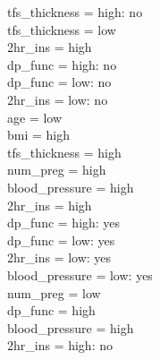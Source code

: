 \documentclass[12pt]{article}
\begin{document}
\textbar\quad \textbar\quad \textbar\quad \textbar\quad \textbar\quad tfs\_thickness = high: no\\
\textbar\quad \textbar\quad \textbar\quad \textbar\quad \textbar\quad tfs\_thickness = low\\
\textbar\quad \textbar\quad \textbar\quad \textbar\quad \textbar\quad \textbar\quad 2hr\_ins = high\\
\textbar\quad \textbar\quad \textbar\quad \textbar\quad \textbar\quad \textbar\quad \textbar\quad dp\_func = high: no\\
\textbar\quad \textbar\quad \textbar\quad \textbar\quad \textbar\quad \textbar\quad \textbar\quad dp\_func = low: no\\
\textbar\quad \textbar\quad \textbar\quad \textbar\quad \textbar\quad \textbar\quad 2hr\_ins = low: no\\
\textbar\quad age = low\\
\textbar\quad \textbar\quad bmi = high\\
\textbar\quad \textbar\quad \textbar\quad tfs\_thickness = high\\
\textbar\quad \textbar\quad \textbar\quad \textbar\quad num\_preg = high\\
\textbar\quad \textbar\quad \textbar\quad \textbar\quad \textbar\quad blood\_pressure = high\\
\textbar\quad \textbar\quad \textbar\quad \textbar\quad \textbar\quad \textbar\quad 2hr\_ins = high\\
\textbar\quad \textbar\quad \textbar\quad \textbar\quad \textbar\quad \textbar\quad \textbar\quad dp\_func = high: yes\\
\textbar\quad \textbar\quad \textbar\quad \textbar\quad \textbar\quad \textbar\quad \textbar\quad dp\_func = low: yes\\
\textbar\quad \textbar\quad \textbar\quad \textbar\quad \textbar\quad \textbar\quad 2hr\_ins = low: yes\\
\textbar\quad \textbar\quad \textbar\quad \textbar\quad \textbar\quad blood\_pressure = low: yes\\
\textbar\quad \textbar\quad \textbar\quad \textbar\quad num\_preg = low\\
\textbar\quad \textbar\quad \textbar\quad \textbar\quad \textbar\quad dp\_func = high\\
\textbar\quad \textbar\quad \textbar\quad \textbar\quad \textbar\quad \textbar\quad blood\_pressure = high\\
\textbar\quad \textbar\quad \textbar\quad \textbar\quad \textbar\quad \textbar\quad \textbar\quad 2hr\_ins = high: no\\
\end{document}
